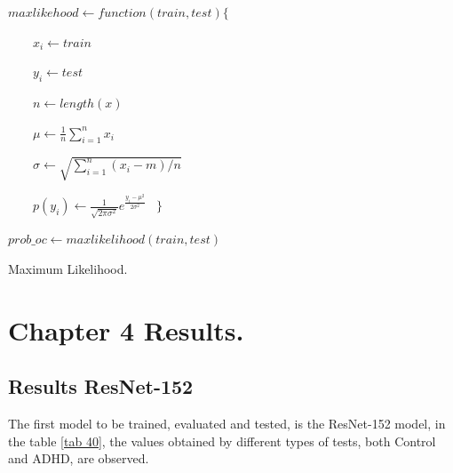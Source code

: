 \documentclass[letterpaper,12pt,openright,oneside]{article}
\begin{document}
\IncMargin{1em}
\begin{algorithm}

\BlankLine






\emph{$  maxlikehood  \gets function(train,test)\{ $}\
\BlankLine


\emph{$ \quad \quad x_i  \gets train $}\
\BlankLine


\emph{$ \quad \quad y_i  \gets test $}\
\BlankLine

\emph{$ \quad \quad n  \gets length(x) $}\
\BlankLine


\emph{$ \quad \quad  \mu  \gets \frac{1}{n}\sum_{i=1}^n x_i $}\
\BlankLine


\emph{$ \quad \quad  \sigma  \gets \sqrt{\sum_{i=1}^n (x_i - m)/n} $}\
\BlankLine

\emph{$ \quad \quad  p(y_i)  \gets  \frac{1}{\sqrt{2 \pi \sigma^2}} e^{\frac{y_i - \mu ^2}{2 \sigma^2}} $}\
\BlankLine
\emph{$  \} $}\
\BlankLine




\emph{$  prob\_oc  \gets maxlikelihood(train,test)  $}\
\BlankLine

	
	\caption{Maximum Likelihood.}\label{imp}
\end{algorithm}\DecMargin{1em}












\pagebreak





\section{Chapter 4 Results.}

\subsection{Results ResNet-152}
The first model to be trained, evaluated and tested, is the ResNet-152 model, in the table \ref{tab 40}, the values obtained by different types of tests, both Control and ADHD, are observed.\\
\end{document}
